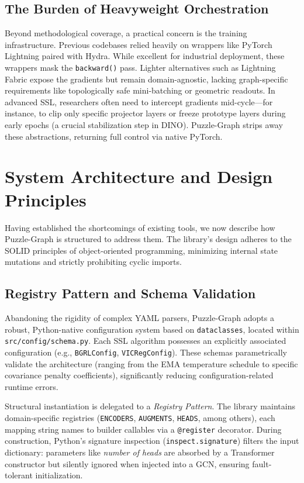 \documentclass[conference]{IEEEtran}
\begin{document}
\subsection{The Burden of Heavyweight Orchestration}
Beyond methodological coverage, a practical concern is the training infrastructure. Previous codebases relied heavily on wrappers like PyTorch Lightning paired with Hydra. While excellent for industrial deployment, these wrappers mask the \texttt{backward()} pass. Lighter alternatives such as Lightning Fabric expose the gradients but remain domain-agnostic, lacking graph-specific requirements like topologically safe mini-batching or geometric readouts. In advanced SSL, researchers often need to intercept gradients mid-cycle---for instance, to clip only specific projector layers or freeze prototype layers during early epochs (a crucial stabilization step in DINO). Puzzle-Graph strips away these abstractions, returning full control via native PyTorch.

\section{System Architecture and Design Principles}
Having established the shortcomings of existing tools, we now describe how Puzzle-Graph is structured to address them. The library's design adheres to the SOLID principles of object-oriented programming, minimizing internal state mutations and strictly prohibiting cyclic imports.

\subsection{Registry Pattern and Schema Validation}
Abandoning the rigidity of complex YAML parsers, Puzzle-Graph adopts a robust, Python-native configuration system based on \texttt{dataclasses}, located within \texttt{src/config/schema.py}. Each SSL algorithm possesses an explicitly associated configuration (e.g., \texttt{BGRLConfig}, \texttt{VICRegConfig}). These schemas parametrically validate the architecture (ranging from the EMA temperature schedule to specific covariance penalty coefficients), significantly reducing configuration-related runtime errors.

Structural instantiation is delegated to a \textit{Registry Pattern}. The library maintains domain-specific registries (\texttt{ENCODERS}, \texttt{AUGMENTS}, \texttt{HEADS}, among others), each mapping string names to builder callables via a \texttt{@register} decorator. During construction, Python's signature inspection (\texttt{inspect.signature}) filters the input dictionary: parameters like \textit{number of heads} are absorbed by a Transformer constructor but silently ignored when injected into a GCN, ensuring fault-tolerant initialization.
\end{document}
